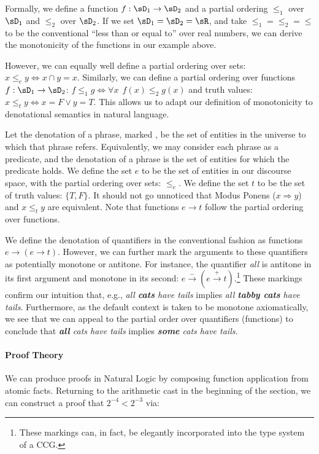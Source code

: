 Formally, we define a function $f:\sD_1 \rightarrow \sD_2$ and a partial
  ordering $\le_1$ over $\sD_1$ and $\le_2$ over $\sD_2$.
If we set $\sD_1 = \sD_2 = \sR$, and take $\le_1 = \le_2 = \le$ to be
  the conventional ``less than or equal to'' over real numbers,
  we can derive the monotonicity of the functions in our example above.

However, we can equally well define a partial ordering over sets:
  $x \le_e y \Leftrightarrow x \cap y = x$.
Similarly, we can define a partial ordering over functions
  $f : \sD_1 \rightarrow \sD_2$:
  $f \le_1 g \Leftrightarrow \forall x ~~ f(x) \leq_2 g(x)$
  and truth values:
  $x \le_t y \Leftrightarrow x = F \lor y = T$.
This allows us to adapt our definition of monotonicity to denotational
  semantics in natural language.

Let the denotation of a phrase, marked \denote{\cdot}, be the set of
  entities in the universe to which that phrase refers.
Equivalently, we may consider each phrase as a predicate, and the denotation
  of a phrase is the set of entities for which the predicate holds.
We define the set $e$ to be the set of entities in our discourse space,
  with the partial ordering over sets: $\le_e$.
We define the set $t$ to be the set of truth values: $\{T, F\}$.
It should not go unnoticed that Modus Ponens ($x \Rightarrow y$)
  and $x \le_t y$ are equivalent.
Note that functions $e \rightarrow t$ follow the partial ordering over
  functions.

We define the denotation of quantifiers in the conventional
  fashion as functions $e \rightarrow (e \rightarrow t)$.
However, we can further mark the arguments to these quantifiers as
  potentially monotone or antitone.
For instance, the quantifier \textit{all} is antitone in its first
  argument and monotone in its second:
  $e \xrightarrow{-} (e \xrightarrow{+} t)$.\footnote{
    These markings can, in fact, be elegantly incorporated into the
    type system \cite{key:2014icard-natlog} of a CCG.
  }
These markings confirm our intuition that, e.g., 
  \textit{all \textbf{cats} have tails}
  implies 
  \textit{all \textbf{tabby cats} have tails}.
Furthermore, as the default context is taken to be monotone
  axiomatically, we see that we can appeal to the partial order
  over quantifiers (functions) to conclude that
  \textit{\textbf{all} cats have tails}
  implies 
  \textit{\textbf{some} cats have tails}.

\paragraph{Proof Theory}
We can produce proofs in Natural Logic by composing
  function application from atomic facts.
Returning to the arithmetic cast in the beginning of the section, we
  can construct a proof that $2^{-4} < 2^{-3}$ via:

